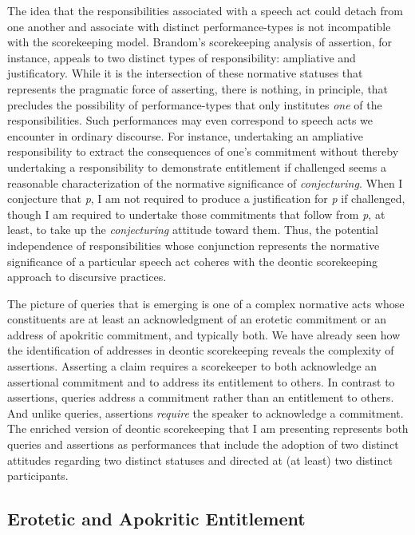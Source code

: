 \documentclass{article}                     %
\begin{document}
The idea that the responsibilities associated with a speech act could
detach from one another and associate with distinct performance-types
is not incompatible with the scorekeeping model. Brandom's scorekeeping
analysis of assertion, for instance, appeals to two distinct types
of responsibility: ampliative and justificatory. While it is the intersection
of these normative statuses that represents the pragmatic force of
asserting, there is nothing, in principle, that precludes the possibility
of performance-types that only institutes \emph{one} of the responsibilities.
Such performances may even correspond to speech acts we encounter
in ordinary discourse. For instance, undertaking an ampliative responsibility
to extract the consequences of one's commitment without thereby undertaking
a responsibility to demonstrate entitlement if challenged seems a
reasonable characterization of the normative significance of \emph{conjecturing}.
When I conjecture that \textit{p}, I am not required to produce a justification
for \textit{p} if challenged, though I am required to undertake those commitments
that follow from \textit{p}, at least, to take up the \emph{conjecturing} attitude
toward them. Thus, the potential independence of responsibilities
whose conjunction represents the normative significance of a particular
speech act coheres with the deontic scorekeeping approach to discursive
practices.

The picture of queries that is emerging is one of a complex normative
acts whose constituents are at least an acknowledgment of an erotetic
commitment or an address of apokritic commitment, and typically both.
We have already seen how the identification of addresses in deontic
scorekeeping reveals the complexity of assertions. Asserting a claim
requires a scorekeeper to both acknowledge an assertional commitment
and to address its entitlement to others. In contrast to assertions,
queries address a commitment rather than an entitlement to others.
And unlike queries, assertions \emph{require} the speaker to acknowledge
a commitment. The enriched version of deontic scorekeeping that I
am presenting represents both queries and assertions as performances
that include the adoption of two distinct attitudes regarding two
distinct statuses and directed at (at least) two distinct participants.






\subsection{Erotetic and Apokritic Entitlement}
\end{document}
